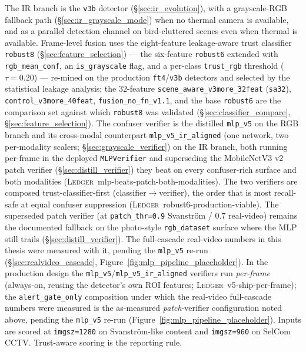 The IR branch is the \texttt{v3b} detector (\S\ref{sec:ir_evolution}), with a grayscale-RGB fallback path (\S\ref{sec:ir_grayscale_mode}) when no thermal camera is available, and as a parallel detection channel on bird-cluttered scenes even when thermal is available. Frame-level fusion uses the eight-feature leakage-aware trust classifier \texttt{robust8} (\S\ref{sec:feature_selection}) --- the six-feature \texttt{robust6} extended with \texttt{rgb\_mean\_conf}, an \texttt{is\_grayscale} flag, and a per-class \texttt{trust\_rgb} threshold ($\tau{=}0.20$) --- re-mined on the production \texttt{ft4}/\texttt{v3b} detectors and selected by the statistical leakage analysis; the $32$-feature \texttt{scene\_aware\_v3more\_32feat} (\texttt{sa32}), \texttt{control\_v3more\_40feat}, \texttt{fusion\_no\_fn\_v1.1}, and the base \texttt{robust6} are the comparison set against which \texttt{robust8} was validated (\S\ref{sec:classifier_compare}, \S\ref{sec:feature_selection}). The confuser verifier is the distilled \texttt{mlp\_v5} on the RGB branch and its cross-modal counterpart \texttt{mlp\_v5\_ir\_aligned} (one network, two per-modality scalers; \S\ref{sec:grayscale_verifier}) on the IR branch, both running per-frame in the deployed \texttt{MLPVerifier} and superseding the MobileNetV3 v2 patch verifier (\S\ref{sec:distill_verifier}) they beat on every confuser-rich surface and both modalities (\textsc{Ledger}~mlp-beats-patch-both-modalities). The two verifiers are composed trust-classifier-first (classifier$\to$verifier), the order that is most recall-safe at equal confuser suppression (\textsc{Ledger}~robust6-production-viable). The superseded patch verifier (at \texttt{patch\_thr=0.9} Svanstr\"om / $0.7$ real-video) remains the documented fallback on the photo-style \texttt{rgb\_dataset} surface where the MLP still trails (\S\ref{sec:distill_verifier}). The full-cascade real-video numbers in this thesis were measured with it, pending the \texttt{mlp\_v5} re-run (\S\ref{sec:realvideo_cascade}, Figure~\ref{fig:mlp_pipeline_placeholder}). In the production design the \texttt{mlp\_v5}/\texttt{mlp\_v5\_ir\_aligned} verifiers run \emph{per-frame} (always-on, reusing the detector's own ROI features; \textsc{Ledger}~v5-ship-per-frame); the \texttt{alert\_gate\_only} composition under which the real-video full-cascade numbers were measured is the as-measured \emph{patch}-verifier configuration noted above, pending the \texttt{mlp\_v5} re-run (Figure~\ref{fig:mlp_pipeline_placeholder}). Inputs are scored at \texttt{imgsz=1280} on Svanstr\"om-like content and \texttt{imgsz=960} on SelCom CCTV. Trust-aware scoring is the reporting rule.

